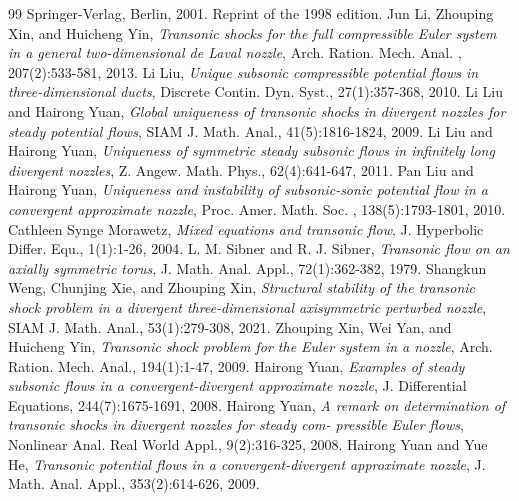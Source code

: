 \documentclass[10pt,a4paper]{amsart}
\numberwithin{equation}{section}
\begin{document}
\begin{thebibliography}{99}
\newblock Springer-Verlag, Berlin, 2001. Reprint of the 1998 edition.
  Jun Li, Zhouping Xin, and Huicheng Yin,
\newblock  \emph{Transonic shocks for the full compressible Euler system in a general two-dimensional de Laval nozzle},
\newblock Arch. Ration. Mech. Anal. , 207(2):533-581, 2013.
   Li Liu,
\newblock  \emph{Unique subsonic compressible potential flows in three-dimensional ducts},
\newblock Discrete  Contin. Dyn. Syst., 27(1):357-368, 2010.
   Li Liu and Hairong Yuan,
\newblock  \emph{Global uniqueness of transonic shocks in divergent nozzles for steady potential flows},
\newblock SIAM J. Math. Anal., 41(5):1816-1824, 2009.
  Li Liu and Hairong Yuan,
\newblock  \emph{Uniqueness of symmetric steady subsonic flows in infinitely long divergent nozzles},
\newblock Z. Angew. Math. Phys., 62(4):641-647, 2011.
  Pan Liu and Hairong Yuan,
\newblock  \emph{Uniqueness and instability of subsonic-sonic potential flow in a convergent approximate nozzle},
\newblock Proc. Amer. Math. Soc. , 138(5):1793-1801, 2010.
  Cathleen Synge Morawetz,
\newblock  \emph{Mixed equations and transonic flow},
\newblock J. Hyperbolic Differ. Equ., 1(1):1-26, 2004.
  L. M. Sibner and R. J. Sibner,
\newblock  \emph{Transonic flow on an axially symmetric torus},
\newblock J. Math. Anal. Appl., 72(1):362-382, 1979.
  Shangkun  Weng,  Chunjing  Xie,  and  Zhouping  Xin,
\newblock  \emph{Structural  stability  of  the  transonic  shock problem in a divergent three-dimensional axisymmetric perturbed nozzle},
\newblock SIAM  J.  Math.  Anal., 53(1):279-308, 2021.
  Zhouping Xin, Wei Yan,  and Huicheng Yin,
\newblock  \emph{Transonic shock problem for the Euler system in a nozzle},
\newblock Arch. Ration. Mech. Anal., 194(1):1-47, 2009.
  Hairong Yuan,
\newblock  \emph{Examples of steady subsonic flows in a convergent-divergent approximate nozzle},
\newblock J. Differential Equations, 244(7):1675-1691, 2008.
  Hairong Yuan,
\newblock  \emph{A remark on determination of transonic shocks in divergent nozzles for steady com- pressible Euler flows},
\newblock Nonlinear Anal. Real  World Appl., 9(2):316-325, 2008.
  Hairong Yuan and Yue He,
\newblock  \emph{Transonic potential flows in a convergent-divergent approximate nozzle},
\newblock J. Math. Anal. Appl., 353(2):614-626, 2009.
\end{thebibliography}
\end{document}
